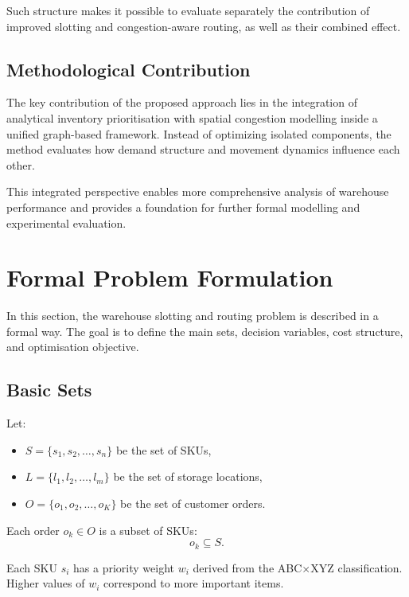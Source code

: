 \documentclass[12pt,a4paper]{article}
\begin{document}
Such structure makes it possible to evaluate separately the contribution of improved slotting
and congestion-aware routing, as well as their combined effect.

\subsection{Methodological Contribution}

The key contribution of the proposed approach lies in the integration of analytical inventory
prioritisation with spatial congestion modelling inside a unified graph-based framework.
Instead of optimizing isolated components, the method evaluates how demand structure and
movement dynamics influence each other.

This integrated perspective enables more comprehensive analysis of warehouse performance
and provides a foundation for further formal modelling and experimental evaluation.

\section{Formal Problem Formulation}

In this section, the warehouse slotting and routing problem is described in a formal way. The
goal is to define the main sets, decision variables, cost structure, and optimisation objective.

\subsection{Basic Sets}

Let:
\begin{itemize}
  \item $S = \{s_1, s_2, \ldots, s_n\}$ be the set of SKUs,
  \item $L = \{l_1, l_2, \ldots, l_m\}$ be the set of storage locations,
  \item $O = \{o_1, o_2, \ldots, o_K\}$ be the set of customer orders.
\end{itemize}

Each order $o_k \in O$ is a subset of SKUs:
\[
  o_k \subseteq S.
\]

Each SKU $s_i$ has a priority weight $w_i$ derived from the ABC$\times$XYZ classification.
Higher values of $w_i$ correspond to more important items.
\end{document}
